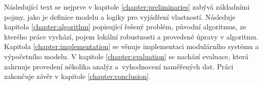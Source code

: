 Následující text se nejprve v kapitole \ref{chapter:preliminaries} zabývá základními pojmy, jako je definice modelu a logiky
pro vyjádření vlastností. Následuje kapitola \ref{chapter:algorithm} popisující řešený problém, původní
algoritmus, ze kterého práce vychází, pojem lokální robustnosti a provedené úpravy v algoritmu.
Kapitola \ref{chapter:implementation} se věnuje implementaci modulárního systému a výpočetního modelu.
V kapitole \ref{chapter:evaluation} se nachází evaluace, která zahrnuje provedení několika analýz
a~vy\-hod\-no\-ce\-ní naměřených dat. Práci zakončuje závěr v kapitole \ref{chapter:conclusion}.

